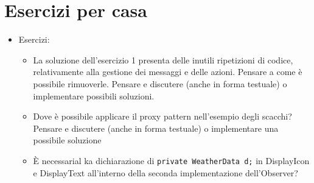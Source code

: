 \documentclass{article}
\begin{document}
\section{Esercizi per casa}
\begin{itemize}
\item Esercizi:
\begin{itemize}
\item La soluzione dell'esercizio 1 presenta delle inutili ripetizioni di codice, relativamente alla gestione dei messaggi e delle azioni. Pensare a come \`e possibile rimuoverle. Pensare e discutere (anche in forma testuale) o implementare possibili soluzioni.
\item Dove \`e possibile applicare il proxy pattern nell'esempio degli scacchi?  Pensare e discutere (anche in forma testuale) o implementare una possibile soluzione
\item \`E necessarial ka dichiarazione di \texttt{private WeatherData d;} in DisplayIcon e DisplayText all'interno della seconda implementazione dell'Observer?
\end{itemize} 
\end{itemize}




\clearpage







\nocite{*}
\end{document}
